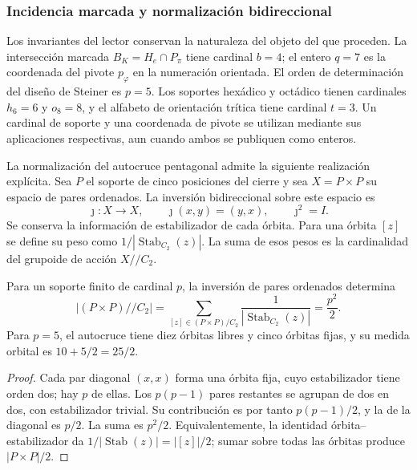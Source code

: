 \subsubsection{Incidencia marcada y normalización bidireccional}
\label{sec:ii09-normalizacion-bidireccional}

Los invariantes del lector conservan la naturaleza del objeto del que
proceden. La intersección marcada $B_K=H_e\cap P_\pi$ tiene cardinal
$b=4$; el entero $q=7$ es la coordenada del pivote $p_\varphi$ en la
numeración orientada. El orden de determinación del diseño de Steiner
es $p=5$. Los soportes hexádico y octádico tienen cardinales $h_6=6$
y $o_8=8$, y el alfabeto de orientación trítica tiene cardinal $t=3$.
Un cardinal de soporte y una coordenada de pivote se utilizan mediante
sus aplicaciones respectivas, aun cuando ambos se publiquen como enteros.

La normalización del autocruce pentagonal admite la siguiente
realización explícita. Sea $P$ el soporte de cinco posiciones del cierre
y sea $X=P\times P$ su espacio de pares ordenados. La inversión
bidireccional sobre este espacio es
\[
 \jmath:X\longrightarrow X,\qquad \jmath(x,y)=(y,x),
 \qquad\jmath^2=I.
\]
Se conserva la información de estabilizador de cada órbita. Para una
órbita $[z]$ se define su peso como
$1/|\operatorname{Stab}_{C_2}(z)|$. La suma de esos pesos es la
cardinalidad del grupoide de acción $X/\!/C_2$.

\begin{proposition}
\label{prop:ii09-semicuadrado-orbital}
Para un soporte finito de cardinal $p$, la inversión de pares ordenados
determina
\[
 |(P\times P)/\!/C_2|
 =\sum_{[z]\in(P\times P)/C_2}
      \frac1{|\operatorname{Stab}_{C_2}(z)|}
 =\frac{p^2}{2}.
\]
Para $p=5$, el autocruce tiene diez órbitas libres y cinco órbitas
fijas, y su medida orbital es $10+5/2=25/2$.
\end{proposition}
\begin{proof}
Cada par diagonal $(x,x)$ forma una órbita fija, cuyo estabilizador
tiene orden dos; hay $p$ de ellas. Los $p(p-1)$ pares restantes se
agrupan de dos en dos, con estabilizador trivial. Su contribución es
por tanto $p(p-1)/2$, y la de la diagonal es $p/2$. La suma es
$p^2/2$. Equivalentemente, la identidad órbita--estabilizador da
$1/|\operatorname{Stab}(z)|=|[z]|/2$; sumar sobre todas las órbitas
produce $|P\times P|/2$.
\end{proof}

